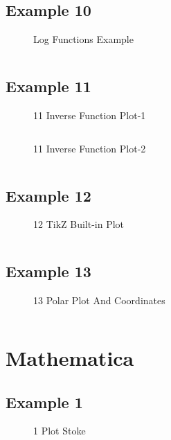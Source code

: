 \subsection{Example 10}
\begin{figure}[!htb]
    \centering
    
    \caption{Log Functions Example}
    \label{fig:10-log-function}
\end{figure}
\inputminted{latex}{./Example/example_10.tex}
\newpage


\subsection{Example 11}
\begin{figure}[!htb]
    \centering
    
    \caption{11 Inverse Function Plot-1}
    \label{fig:11-inverse-function-1}
\end{figure}
\inputminted{latex}{./Example/example_11_1.tex}

\begin{figure}[!htb]
    \centering
    
    \caption{11 Inverse Function Plot-2}
    \label{fig:11-inverse-function-2}
\end{figure}
\inputminted{latex}{./Example/example_11_2.tex}
\newpage

\subsection{Example 12}
\begin{figure}[!htb]
    \centering
    
    \caption{12 TikZ Built-in Plot}
    \label{fig:12-tikz-plot}
\end{figure}
\inputminted{latex}{./Example/example_12.tex}
\newpage

\subsection{Example 13}
\begin{figure}[!htb]
    \centering
    
    \caption{13 Polar Plot And Coordinates}
    \label{fig:13-polar-plot}
\end{figure}
\inputminted{latex}{./Example/example_13.tex}
\newpage


\section{Mathematica}
\subsection{Example 1}
\begin{figure}[!htb]
    \centering
    
    \caption{1 Plot Stoke}
    \label{fig:1-plot-stoke}
\end{figure}
\inputminted{mathematica}{./Example/example_1.wls}
\newpage


